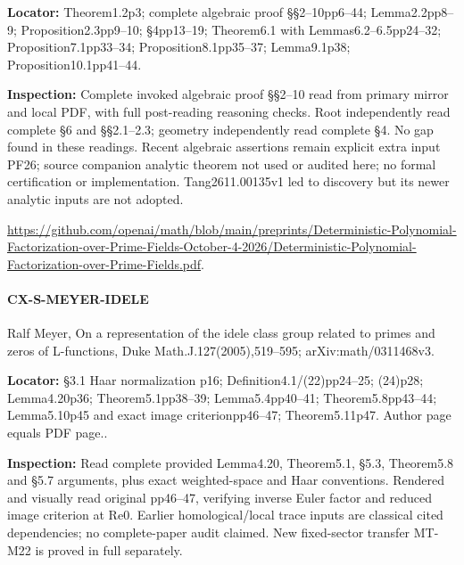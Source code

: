 \documentclass[11pt,a4paper]{article}
\begin{document}
\textbf{Locator:} Theorem1.\allowbreak{}2p3; complete algebraic proof §§2–\allowbreak{}10pp6–\allowbreak{}44; Lemma2.\allowbreak{}2pp8–\allowbreak{}9; Proposition2.\allowbreak{}3pp9–\allowbreak{}10; §4pp13–\allowbreak{}19; Theorem6.\allowbreak{}1 with Lemmas6.\allowbreak{}2–\allowbreak{}6.\allowbreak{}5pp24–\allowbreak{}32; Proposition7.\allowbreak{}1pp33–\allowbreak{}34; Proposition8.\allowbreak{}1pp35–\allowbreak{}37; Lemma9.\allowbreak{}1p38; Proposition10.\allowbreak{}1pp41–\allowbreak{}44.

\textbf{Inspection:} Complete invoked algebraic proof §§2–\allowbreak{}10 read from primary mirror and local PDF, with full post-reading reasoning checks.\allowbreak{} Root independently read complete §6 and §§2.\allowbreak{}1–\allowbreak{}2.\allowbreak{}3; geometry independently read complete §4.\allowbreak{} No gap found in these readings.\allowbreak{} Recent algebraic assertions remain explicit extra input PF26; source companion analytic theorem not used or audited here; no formal certification or implementation.\allowbreak{} Tang2611.\allowbreak{}00135v1 led to discovery but its newer analytic inputs are not adopted.\allowbreak{}

\url{https://github.com/openai/math/blob/main/preprints/Deterministic-Polynomial-Factorization-over-Prime-Fields-October-4-2026/Deterministic-Polynomial-Factorization-over-Prime-Fields.pdf}.

\paragraph{CX-S-MEYER-IDELE} Ralf Meyer, On a representation of the idele class group related to primes and zeros of L-functions, Duke Math.\allowbreak{}J.\allowbreak{}127(2005),519–\allowbreak{}595; arXiv:\allowbreak{}math/\allowbreak{}0311468v3.

\textbf{Locator:} §3.\allowbreak{}1 Haar normalization p16; Definition4.\allowbreak{}1/\allowbreak{}(22)pp24–\allowbreak{}25; (24)p28; Lemma4.\allowbreak{}20p36; Theorem5.\allowbreak{}1pp38–\allowbreak{}39; Lemma5.\allowbreak{}4pp40–\allowbreak{}41; Theorem5.\allowbreak{}8pp43–\allowbreak{}44; Lemma5.\allowbreak{}10p45 and exact image criterionpp46–\allowbreak{}47; Theorem5.\allowbreak{}11p47.\allowbreak{} Author page equals PDF page.\allowbreak{}.

\textbf{Inspection:} Read complete provided Lemma4.\allowbreak{}20, Theorem5.\allowbreak{}1, §5.\allowbreak{}3, Theorem5.\allowbreak{}8 and §5.\allowbreak{}7 arguments, plus exact weighted-space and Haar conventions.\allowbreak{} Rendered and visually read original pp46–\allowbreak{}47, verifying inverse Euler factor and reduced image criterion at Re0.\allowbreak{} Earlier homological/\allowbreak{}local trace inputs are classical cited dependencies; no complete-paper audit claimed.\allowbreak{} New fixed-sector transfer MT-M22 is proved in full separately.\allowbreak{}
\end{document}

